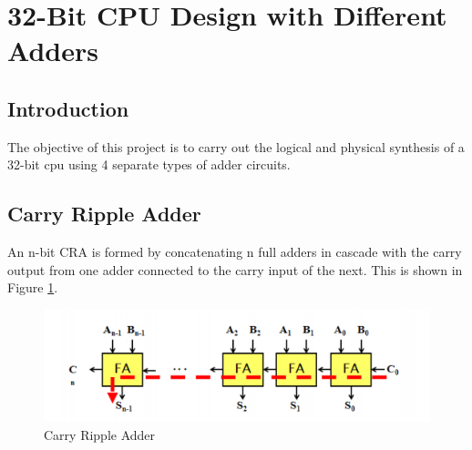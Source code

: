 \documentclass[12pt]{article}
\begin{document}
\section{32-Bit CPU Design with Different Adders}

\subsection{Introduction}
The objective of this project is to carry out the logical and physical synthesis of a 32-bit cpu using 4 separate types of adder circuits. 
\subsection{Carry Ripple Adder}
An n-bit CRA is formed by concatenating n full adders in cascade with the carry output from one adder connected to the carry input of the next. This is shown in Figure \ref{fig:carry-ripple}.
\begin{figure}[H]
\centering
\includegraphics[width=0.7\linewidth]{carry-ripple}
\caption{Carry Ripple Adder}
\label{fig:carry-ripple}
\end{figure}
\end{document}
